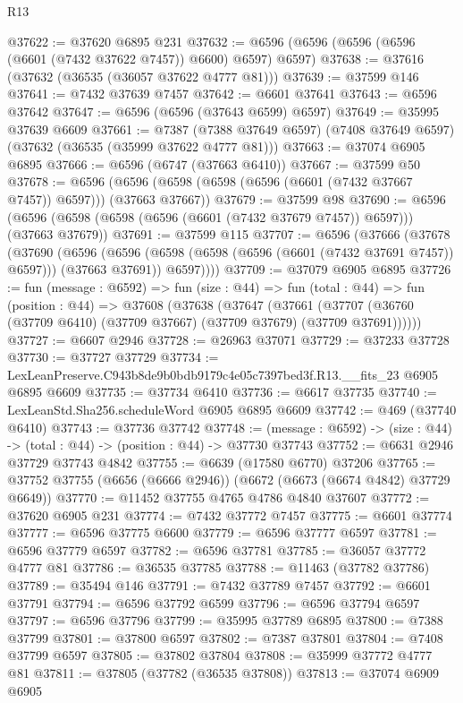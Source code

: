\begin{lexlean}{R13}
\begin{coremodule}
@37622 := @37620 @6895 @231
@37632 := @6596 (@6596 (@6596 (@6596 (@6601 (@7432 @37622 @7457)) @6600) @6597) @6597)
@37638 := @37616 (@37632 (@36535 (@36057 @37622 @4777 @81)))
@37639 := @37599 @146
@37641 := @7432 @37639 @7457
@37642 := @6601 @37641
@37643 := @6596 @37642
@37647 := @6596 (@6596 (@37643 @6599) @6597)
@37649 := @35995 @37639 @6609
@37661 := @7387
    (@7388 @37649 @6597)
    (@7408 @37649 @6597)
    (@37632 (@36535 (@35999 @37622 @4777 @81)))
@37663 := @37074 @6905 @6895
@37666 := @6596 (@6747 (@37663 @6410))
@37667 := @37599 @50
@37678 := @6596 (@6596 (@6598 (@6598 (@6596 (@6601 (@7432 @37667 @7457)) @6597))) (@37663 @37667))
@37679 := @37599 @98
@37690 := @6596 (@6596 (@6598 (@6598 (@6596 (@6601 (@7432 @37679 @7457)) @6597))) (@37663 @37679))
@37691 := @37599 @115
@37707 := @6596
    (@37666
      (@37678
        (@37690
          (@6596
            (@6596 (@6598 (@6598 (@6596 (@6601 (@7432 @37691 @7457)) @6597))) (@37663 @37691))
            @6597))))
@37709 := @37079 @6905 @6895
@37726 := fun (message : @6592) =>
  fun (size : @44) =>
  fun (total : @44) =>
  fun (position : @44) =>
  @37608
    (@37638
      (@37647
        (@37661 (@37707 (@36760 (@37709 @6410) (@37709 @37667) (@37709 @37679) (@37709 @37691))))))
@37727 := @6607 @2946
@37728 := @26963 @37071
@37729 := @37233 @37728
@37730 := @37727 @37729
@37734 := LexLeanPreserve.C943b8de9b0bdb9179c4e05c7397bed3f.R13.__fits_23 @6905 @6895 @6609
@37735 := @37734 @6410
@37736 := @6617 @37735
@37740 := LexLeanStd.Sha256.scheduleWord @6905 @6895 @6609
@37742 := @469 (@37740 @6410)
@37743 := @37736 @37742
@37748 := (message : @6592) -> (size : @44) -> (total : @44) -> (position : @44) -> @37730 @37743
@37752 := @6631 @2946 @37729 @37743 @4842
@37755 := @6639 (@17580 @6770) @37206
@37765 := @37752 @37755 (@6656 (@6666 @2946)) (@6672 (@6673 (@6674 @4842) @37729 @6649))
@37770 := @11452 @37755 @4765 @4786 @4840 @37607
@37772 := @37620 @6905 @231
@37774 := @7432 @37772 @7457
@37775 := @6601 @37774
@37777 := @6596 @37775 @6600
@37779 := @6596 @37777 @6597
@37781 := @6596 @37779 @6597
@37782 := @6596 @37781
@37785 := @36057 @37772 @4777 @81
@37786 := @36535 @37785
@37788 := @11463 (@37782 @37786)
@37789 := @35494 @146
@37791 := @7432 @37789 @7457
@37792 := @6601 @37791
@37794 := @6596 @37792 @6599
@37796 := @6596 @37794 @6597
@37797 := @6596 @37796
@37799 := @35995 @37789 @6895
@37800 := @7388 @37799
@37801 := @37800 @6597
@37802 := @7387 @37801
@37804 := @7408 @37799 @6597
@37805 := @37802 @37804
@37808 := @35999 @37772 @4777 @81
@37811 := @37805 (@37782 (@36535 @37808))
@37813 := @37074 @6909 @6905

\end{coremodule}
\end{lexlean}
